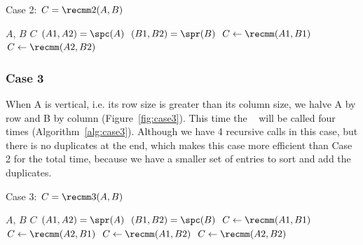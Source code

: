 \begin{algorithm}[tbh] 
  \caption{Case 2: $C = \recmm2(A, B)$} 
  \begin{algorithmic}[1]
    \Require $A$, $B$
    \Ensure  $C$
    \State $(A1, A2) = \spc(A)$
    \State $(B1, B2) = \spr(B)$
    \State $C \leftarrow \recmm(A1,B1)$
    \State $C \leftarrow \recmm(A2,B2)$
  \end{algorithmic}
  \label{alg:case2}
\end{algorithm}


\subsubsection{Case 3}
\label{sec:case3}
When A is vertical, i.e. its row size is greater than its column size, we halve A by row and B by column (Figure~\ref{fig:case3}). This time the \recmm~ will be called four times (Algorithm~\ref{alg:case3}).  Although we have 4 recursive calls in this case, but there is no duplicates at the end, which makes this case more efficient than Case 2 for the total time, because we have a smaller set of entries to sort and add the duplicates.

\begin{algorithm}[H] 
  \caption{Case 3: $C = \recmm3(A, B)$}
  \begin{algorithmic}[1]
    \Require $A$, $B$
    \Ensure  $C$
    \State $(A1, A2) = \spr(A)$
    \State $(B1, B2) = \spc(B)$
    \State $C \leftarrow \recmm(A1,B1)$
    \State $C \leftarrow \recmm(A2,B1)$
    \State $C \leftarrow \recmm(A1,B2)$
    \State $C \leftarrow \recmm(A2,B2)$
  \end{algorithmic}
  \label{alg:case3}
\end{algorithm}

